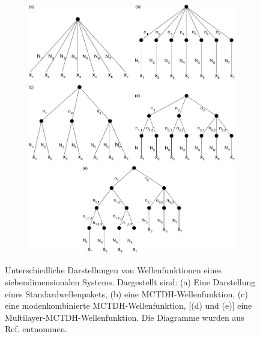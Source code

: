 \begin{figure}
    \centering
    \captionsetup[subfigure]{position=top, labelfont=bf,textfont=normalfont,singlelinecheck=off,justification=raggedright,labelformat=empty}
    \begin{subfigure}{\textwidth}
        \caption{}\label{fig:a}
    \end{subfigure}
    \begin{subfigure}{\textwidth}
        \caption{}\label{fig:b}
    \end{subfigure}
    \begin{subfigure}{\textwidth}
        \caption{}\label{fig:c}
    \end{subfigure}
    \begin{subfigure}{\textwidth}
        \caption{}\label{fig:d}
    \end{subfigure}
    \begin{subfigure}{\textwidth}
        \caption{}\label{fig:e}
    \end{subfigure}
    \begin{subfigure}{\textwidth}
        \caption{}\label{fig:f}
        \vspace*{-4cm}\includegraphics[width=\textwidth]{figures/treeDiagramms}
    \end{subfigure}
    \caption{Unterschiedliche Darstellungen von Wellenfunktionen eines siebendimensionalen Systems. Dargestellt sind: (a) Eine Darstellung eines Standardwellenpakets,
      (b) eine MCTDH-Wellenfunktion, (c) eine modenkombinierte MCTDH-Wellenfunktion, [(d) und (e)] eine Multilayer-MCTDH-Wellenfunktion. Die Diagramme wurden aus Ref.\cite{Mreview2} 
      entnommen.} \label{fig:tree}
\end{figure}

